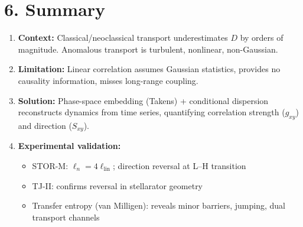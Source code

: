 \documentclass[11pt]{article}
\begin{document}
\section*{6. Summary}

\begin{enumerate}
\item \textbf{Context:} Classical/neoclassical transport underestimates $D$ by orders of magnitude. Anomalous transport is turbulent, nonlinear, non-Gaussian.
\item \textbf{Limitation:} Linear correlation assumes Gaussian statistics, provides no causality information, misses long-range coupling.
\item \textbf{Solution:} Phase-space embedding (Takens) + conditional dispersion reconstructs dynamics from time series, quantifying correlation strength ($g_{xy}$) and direction ($S_{xy}$).
\item \textbf{Experimental validation:} 
   \begin{itemize}
   	\item STOR-M: $\ell_n = 4\ell_{\text{lin}}$; direction reversal at L–H transition
   	\item TJ-II: confirms reversal in stellarator geometry
   	\item Transfer entropy (van Milligen): reveals minor barriers, jumping, dual transport channels
   \end{itemize}
\end{enumerate}


\printbibliography
\end{document}
